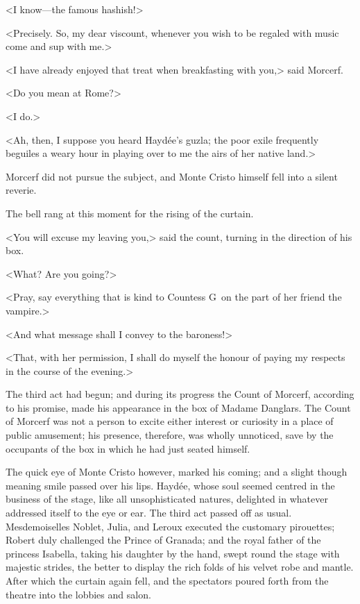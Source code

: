  <I know—the famous hashish!> 

 <Precisely. So, my dear viscount, whenever you wish to be regaled with music come and sup with me.> 

 <I have already enjoyed that treat when breakfasting with you,> said Morcerf. 

 <Do you mean at Rome?> 

 <I do.> 

 <Ah, then, I suppose you heard Haydée's guzla; the poor exile frequently beguiles a weary hour in playing over to me the airs of her native land.> 

 Morcerf did not pursue the subject, and Monte Cristo himself fell into a silent reverie. 

 The bell rang at this moment for the rising of the curtain. 

 <You will excuse my leaving you,> said the count, turning in the direction of his box. 

 <What? Are you going?> 

 <Pray, say everything that is kind to Countess G\doubleemdash~on the part of her friend the vampire.> 

 <And what message shall I convey to the baroness!> 

 <That, with her permission, I shall do myself the honour of paying my respects in the course of the evening.> 

 The third act had begun; and during its progress the Count of Morcerf, according to his promise, made his appearance in the box of Madame Danglars. The Count of Morcerf was not a person to excite either interest or curiosity in a place of public amusement; his presence, therefore, was wholly unnoticed, save by the occupants of the box in which he had just seated himself. 

 The quick eye of Monte Cristo however, marked his coming; and a slight though meaning smile passed over his lips. Haydée, whose soul seemed centred in the business of the stage, like all unsophisticated natures, delighted in whatever addressed itself to the eye or ear.  The third act passed off as usual. Mesdemoiselles Noblet, Julia, and Leroux executed the customary pirouettes; Robert duly challenged the Prince of Granada; and the royal father of the princess Isabella, taking his daughter by the hand, swept round the stage with majestic strides, the better to display the rich folds of his velvet robe and mantle. After which the curtain again fell, and the spectators poured forth from the theatre into the lobbies and salon. 

